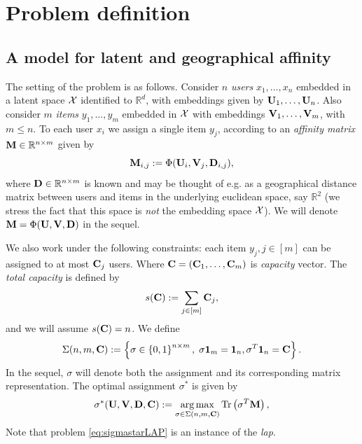 \section{Problem definition}

\subsection*{A model for latent and geographical affinity}

The setting of the problem is as follows. Consider $n$ \emph{users} $x_1,
    \ldots, x_n$ embedded in a latent space $\mathcal {X}$ identified to $\mathbb{R}^d$, with
embeddings given by $\mathbf{U}_1, \ldots, \mathbf{U}_n$. Also consider $m$ \emph{items}
$y_1,\ldots, y_m$ embedded in $\mathcal {X}$ with embeddings $\mathbf{V}_1, \ldots, \mathbf{V}_m$, with
$m \leq n$. To each user $x_i$ we assign a single item $y_j$, according to an
\emph{affinity matrix} $\mathbf{M} \in \mathbb{R}^{n \times m}$ given by
\begin{equation*}\label{eq:def_M}
    \mathbf{M}_{i,j} := \Phi(\mathbf{U}_i,\mathbf{V}_j,\mathbf{D}_{i,j}),
\end{equation*} where $\mathbf{D} \in \mathbb{R}^{n \times m}$ is known and may be thought of e.g. as a geographical distance matrix between users and items in the underlying euclidean space, say $\mathbb{R}^2$ (we stress the fact that this space is \emph{not} the embedding space $\mathcal {X}$). We will denote $\mathbf{M} = \Phi(\mathbf{U},\mathbf{V},\mathbf{D})$ in the sequel.

We also work under the following constraints: each item $y_j, j \in [m]$ can be
assigned to at most $\mathbf{C}_j$ users. Where $\mathbf{C}=(\mathbf{C}_1,\ldots,\mathbf{C}_m)$ is
\emph{capacity} vector. The \emph{total capacity} is defined by
\begin{equation*}
    s(\mathbf{C}) := \sum_{j \in [m]} \mathbf{C}_j,
\end{equation*} and we will assume $s(\mathbf{C}) = n$.
We define
\begin{equation*}\label{eq:defSigma}
    \Sigma(n,m,\mathbf{C}) := \left\lbrace \sigma \in \left\{ 0,1\right\}^{n \times m}, \; {\sigma \mathbf{1}_m}  = { \mathbf{1}_n}, {\sigma^T \mathbf{1}_n} = \mathbf{C} \right\rbrace.
\end{equation*} In the sequel, $\sigma$ will denote both the assignment and its corresponding matrix representation. The optimal assignment $\sigma^*$ is given by
\begin{equation}\label{eq:sigmastarLAP}
    \sigma^*(\mathbf{U},\mathbf{V},\mathbf{D},\mathbf{C}) := \operatorname*{arg\,max}_{\sigma \in \Sigma(n,m,\mathbf{C})} {\rm Tr}\left( \sigma^T \mathbf{M} \right),
\end{equation}
Note that problem \eqref{eq:sigmastarLAP} is an instance of the \emph{\ac{lap}}.

